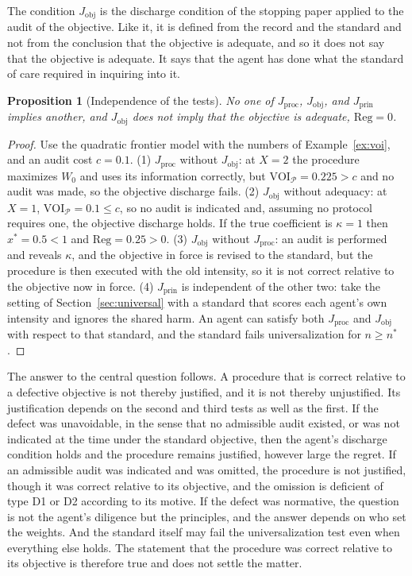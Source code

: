 \documentclass[11pt]{article}
\newcommand{\Reg}{\mathrm{Reg}}
\newcommand{\VOI}{\mathrm{VOI}}
\theoremstyle{plain}
\newtheorem{proposition}{Proposition}
\theoremstyle{definition}
\begin{document}
The condition $J_{\mathrm{obj}}$ is the discharge condition of the stopping paper applied to the audit of the objective. Like it, it is defined from the record and the standard and not from the conclusion that the objective is adequate, and so it does not say that the objective is adequate. It says that the agent has done what the standard of care required in inquiring into it.

\begin{proposition}[Independence of the tests]\label{prop:three}
No one of $J_{\mathrm{proc}}$, $J_{\mathrm{obj}}$, and $J_{\mathrm{prin}}$ implies another, and $J_{\mathrm{obj}}$ does not imply that the objective is adequate, $\Reg=0$.
\end{proposition}

\begin{proof}
Use the quadratic frontier model with the numbers of Example~\ref{ex:voi}, and an audit cost $c=0.1$.
(1) $J_{\mathrm{proc}}$ without $J_{\mathrm{obj}}$: at $X=2$ the procedure maximizes $W_0$ and uses its information correctly, but $\VOI_{\mathcal P}=0.225>c$ and no audit was made, so the objective discharge fails.
(2) $J_{\mathrm{obj}}$ without adequacy: at $X=1$, $\VOI_{\mathcal P}=0.1\le c$, so no audit is indicated and, assuming no protocol requires one, the objective discharge holds. If the true coefficient is $\kappa=1$ then $x^*=0.5<1$ and $\Reg=0.25>0$.
(3) $J_{\mathrm{obj}}$ without $J_{\mathrm{proc}}$: an audit is performed and reveals $\kappa$, and the objective in force is revised to the standard, but the procedure is then executed with the old intensity, so it is not correct relative to the objective now in force.
(4) $J_{\mathrm{prin}}$ is independent of the other two: take the setting of Section~\ref{sec:universal} with a standard that scores each agent's own intensity and ignores the shared harm. An agent can satisfy both $J_{\mathrm{proc}}$ and $J_{\mathrm{obj}}$ with respect to that standard, and the standard fails universalization for $n\ge n^*$.
\end{proof}

The answer to the central question follows. A procedure that is correct relative to a defective objective is not thereby justified, and it is not thereby unjustified. Its justification depends on the second and third tests as well as the first. If the defect was unavoidable, in the sense that no admissible audit existed, or was not indicated at the time under the standard objective, then the agent's discharge condition holds and the procedure remains justified, however large the regret. If an admissible audit was indicated and was omitted, the procedure is not justified, though it was correct relative to its objective, and the omission is deficient of type D1 or D2 according to its motive. If the defect was normative, the question is not the agent's diligence but the principles, and the answer depends on who set the weights. And the standard itself may fail the universalization test even when everything else holds. The statement that the procedure was correct relative to its objective is therefore true and does not settle the matter.
\end{document}
